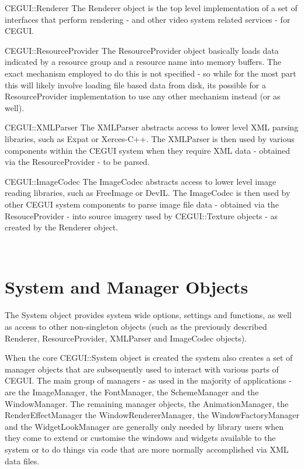 \begin{DoxyParagraph}{C\+E\+G\+UI\+::Renderer}
The Renderer object is the top level implementation of a set of interfaces that perform rendering -\/ and other video system related services -\/ for C\+E\+G\+UI.
\end{DoxyParagraph}
\begin{DoxyParagraph}{C\+E\+G\+UI\+::Resource\+Provider}
The Resource\+Provider object basically loads data indicated by a resource group and a resource name into memory buffers. The exact mechanism employed to do this is not specified -\/ so while for the most part this will likely involve loading file based data from disk, it\textquotesingle{}s possible for a Resource\+Provider implementation to use any other mechanism instead (or as well).
\end{DoxyParagraph}
\begin{DoxyParagraph}{C\+E\+G\+UI\+::X\+M\+L\+Parser}
The X\+M\+L\+Parser abstracts access to lower level X\+ML parsing libraries, such as Expat or Xerces-\/\+C++. The X\+M\+L\+Parser is then used by various components within the C\+E\+G\+UI system when they require X\+ML data -\/ obtained via the Resource\+Provider -\/ to be parsed.
\end{DoxyParagraph}
\begin{DoxyParagraph}{C\+E\+G\+UI\+::Image\+Codec}
The Image\+Codec abstracts access to lower level image reading libraries, such as Free\+Image or Dev\+IL. The Image\+Codec is then used by other C\+E\+G\+UI system components to parse image file data -\/ obtained via the Resouce\+Provider -\/ into source imagery used by C\+E\+G\+U\+I\+::\+Texture objects -\/ as created by the Renderer object.
\end{DoxyParagraph}
~\newline
 \hypertarget{arch_overview_arch_overview_sys_and_mgrs}{}\section{System and Manager Objects}\label{arch_overview_arch_overview_sys_and_mgrs}
The System object provides system wide options, settings and functions, as well as access to other non-\/singleton objects (such as the previously described Renderer, Resource\+Provider, X\+M\+L\+Parser and Image\+Codec objects).

When the core C\+E\+G\+U\+I\+::\+System object is created the system also creates a set of manager objects that are subsequently used to interact with various parts of C\+E\+G\+UI. The main group of managers -\/ as used in the majority of applications -\/ are the Image\+Manager, the Font\+Manager, the Scheme\+Manager and the Window\+Manager. The remaining manager objects, the Animation\+Manager, the Render\+Effect\+Manager the Window\+Renderer\+Manager, the Window\+Factory\+Manager and the Widget\+Look\+Manager are generally only needed by library users when they come to extend or customise the windows and widgets available to the system or to do things via code that are more normally accomplished via X\+ML data files.

